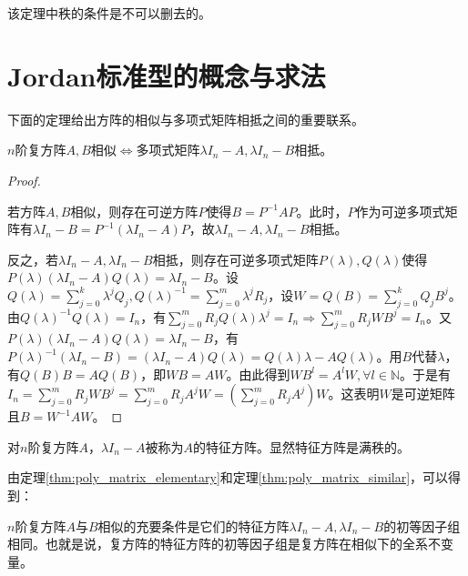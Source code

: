         \begin{note}
            该定理中秩的条件是不可以删去的。
        \end{note}

    \section{Jordan标准型的概念与求法}

        下面的定理给出方阵的相似与多项式矩阵相抵之间的重要联系。

        \begin{theorem}
            \label{thm:poly_matrix_similar}
            $n$阶复方阵$A,B$相似$\Leftrightarrow$多项式矩阵$\lambda I_n-A,\lambda I_n-B$相抵。
        \end{theorem}

        \begin{proof}
            $ $

            若方阵$A,B$相似，则存在可逆方阵$P$使得$B=P^{-1}AP$。此时，$P$作为可逆多项式矩阵有$\lambda I_n-B=P^{-1}(\lambda I_n-A)P$，故$\lambda I_n-A,\lambda I_n-B$相抵。

            反之，若$\lambda I_n-A,\lambda I_n-B$相抵，则存在可逆多项式矩阵$P(\lambda),Q(\lambda)$使得$P(\lambda)(\lambda I_n-A)Q(\lambda)=\lambda I_n-B$。设$Q(\lambda)=\sum\limits_{j=0}^{k}\lambda^j Q_{j},Q(\lambda)^{-1}=\sum\limits_{j=0}^{m}\lambda^j R_j$，设$W=Q(B)=\sum\limits_{j=0}^{k}Q_{j}B^j$。由$Q(\lambda)^{-1}Q(\lambda)=I_n$，有$\sum\limits_{j=0}^m R_j Q(\lambda)\lambda^j=I_n\Rightarrow\sum\limits_{j=0}^m R_j WB^j=I_n$。又$P(\lambda)(\lambda I_n-A)Q(\lambda)=\lambda I_n-B$，有$P(\lambda)^{-1}(\lambda I_n-B)=(\lambda I_n-A)Q(\lambda)=Q(\lambda)\lambda-AQ(\lambda)$。用$B$代替$\lambda$，有$Q(B)B=AQ(B)$，即$WB=AW$。由此得到$WB^l=A^l W,\forall l\in \mathbb{N}$。于是有$I_n=\sum\limits_{j=0}^m R_j WB^j=\sum\limits_{j=0}^m R_j A^j W=(\sum\limits_{j=0}^m R_j A^j)W$。这表明$W$是可逆矩阵且$B=W^{-1}AW$。
        \end{proof}

        \begin{note}
            对$n$阶复方阵$A$，$\lambda I_n-A$被称为$A$的特征方阵。显然特征方阵是满秩的。
        \end{note}

        由定理\ref{thm:poly_matrix_elementary}和定理\ref{thm:poly_matrix_similar}，可以得到：

        \begin{theorem}
            $n$阶复方阵$A$与$B$相似的充要条件是它们的特征方阵$\lambda I_n-A,\lambda I_n-B$的初等因子组相同。也就是说，复方阵的特征方阵的初等因子组是复方阵在相似下的全系不变量。
        \end{theorem}

